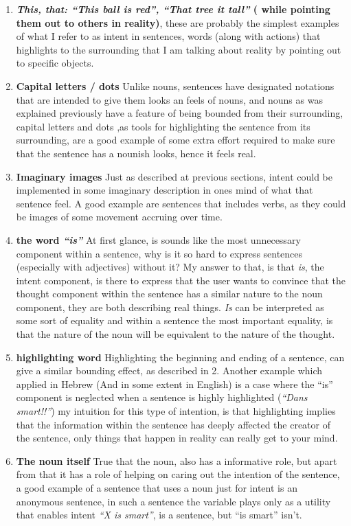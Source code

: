 \documentclass[10pt]{article}
\begin{document}
\begin{enumerate}
\item
\textbf{\textit{This, that: “This ball is red”, “That tree it tall”} ( while pointing them out to others  in reality)}, these are probably the simplest examples of what I refer to as intent in sentences, words (along with actions) that highlights to the surrounding that I am talking about reality by pointing out to specific objects.
\item
\textbf{Capital letters / dots} Unlike nouns, sentences have designated notations that are intended to give them looks an feels of nouns, and nouns as was explained previously have  a feature of being bounded from their surrounding, capital letters and dots ,as tools for highlighting the sentence from its surrounding, are a good example of some extra effort  required to make sure that the sentence has a nounish looks, hence it feels real.
\item
\textbf{Imaginary images} Just as described at previous sections, intent could be implemented in some imaginary description in ones mind of what that sentence feel. A good example are sentences that includes verbs, as they could be images of some movement accruing over time.
\item
\textbf{the word \textit{“is” }} At first glance, is sounds like the most unnecessary component within a sentence,  why is it so hard to express sentences (especially with adjectives) without it? My answer to that, is that \textit{is}, the intent component, is there to express that the user wants to convince that the thought component within the sentence has a similar nature to the noun component, they are both describing real things. \textit{Is} can be interpreted as some sort of equality and within a sentence the most  important equality, is that the nature of the noun will be equivalent to the nature of the thought.
\item
\textbf{highlighting word} Highlighting the beginning and ending of a sentence,  can give a similar bounding effect, as described in 2. Another example which applied in Hebrew (And in some extent in English) is a case where the “is” component is neglected when a sentence is highly highlighted (\textit{“Dans smart!!”}) my intuition for this type of intention, is that highlighting implies that the information within the sentence has deeply affected the creator of the sentence,  only things that  happen in reality can really get to your mind.
\item
\textbf{The noun itself} True that the noun, also has a informative role, but apart from that it has a role of helping on caring out the intention of the sentence, a good example of a sentence that uses a noun just for intent is an anonymous sentence, in such a sentence the variable plays only as a utility that enables intent \textit{“X is smart”}, is a sentence, but “is smart” isn't.
\end{enumerate}
\end{document}
